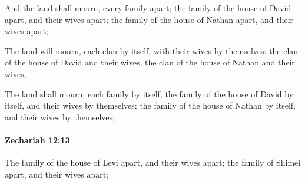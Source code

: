 			\begin{versebox}
					\item[BHS] 
					\item[LXX] 
					\item[ASV] And the land shall mourn, every family apart; the family of the house of David apart, and their wives apart; the family of the house of Nathan apart, and their wives apart;
					\item[NIV] The land will mourn, each clan by itself, with their wives by themselves: the clan of the house of David and their wives, the clan of the house of Nathan and their wives,
					\item[NRSV] The land shall mourn, each family by itself; the family of the house of David by itself, and their wives by themselves; the family of the house of Nathan by itself, and their wives by themselves;
			\end{versebox}

		\paragraph{Zechariah 12:13} %
			\label{ZECHARIAH-12-13}

			The family of the house of Levi apart, and their wives apart; the family of Shimei apart, and their wives apart;

